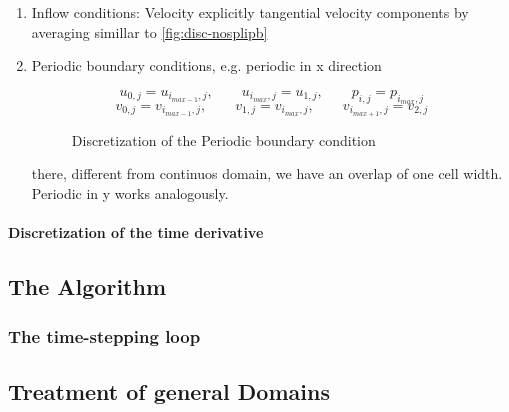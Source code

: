 \documentclass[a4paper,11pt]{scrartcl}
\begin{document}
\begin{enumerate}
	\item Inflow conditions: Velocity explicitly tangential velocity components by averaging simillar to \ref{fig:disc-nosplipb}
	\item Periodic boundary conditions, e.g. periodic in x direction

\begin{figure}[H]
	\centering
	\[ u_{0,j} = u_{i_{max-1},j}, \qquad u_{i_{max},j} = u_{1,j}, \qquad p_{i,j} = p_{i_{max},j} \]
	\[ v_{0,j} = v_{i_{max-1},j}, \qquad v_{1,j} = v_{i_{max},j}, \qquad v_{i_{max+1},j} = v_{2,j}\]
	\renewcommand{\thefigure}{3.27}
	\caption{Discretization of the Periodic boundary condition}
	\label{fig:disc-freesplipb}
\end{figure}
there, different from continuos domain, we have an overlap of one cell width. Periodic in y works analogously.


\end{enumerate}
\paragraph{Discretization of the time derivative}


\subsection{The Algorithm}

\subsubsection{The time-stepping loop}







\subsection{Treatment of general Domains}
\end{document}
